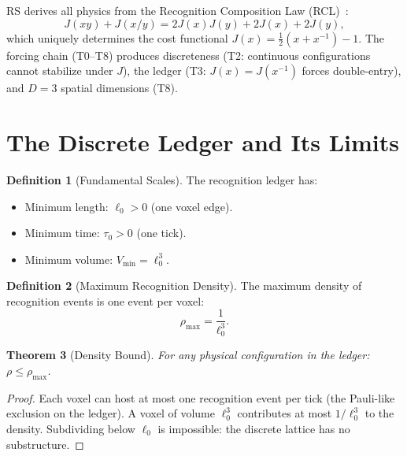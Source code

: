 \documentclass[12pt,a4paper]{article}
\newtheorem{theorem}{Theorem}[section]
\theoremstyle{definition}
\newtheorem{definition}[theorem]{Definition}
\theoremstyle{remark}
\begin{document}
RS derives all physics from the Recognition Composition Law
(RCL)~\cite{RS_Axioms}:
\begin{equation}
  J(xy) + J(x/y) = 2J(x)J(y) + 2J(x) + 2J(y),
\end{equation}
which uniquely determines the cost functional
$J(x) = \tfrac{1}{2}(x + x^{-1}) - 1$.  The forcing chain
(T0--T8) produces discreteness (T2: continuous
configurations cannot stabilize under $J$), the ledger
(T3: $J(x) = J(x^{-1})$ forces double-entry), and
$D = 3$ spatial dimensions (T8).

\section{The Discrete Ledger and Its Limits}
\label{sec:ledger}

\begin{definition}[Fundamental Scales]
The recognition ledger has:
\begin{itemize}
  \item Minimum length: $\ell_0 > 0$ (one voxel edge).
  \item Minimum time: $\tau_0 > 0$ (one tick).
  \item Minimum volume: $V_{\min} = \ell_0^3$.
\end{itemize}
\end{definition}

\begin{definition}[Maximum Recognition Density]
\label{def:rho-max}
The maximum density of recognition events is one event per voxel:
\begin{equation}
  \rho_{\max} = \frac{1}{\ell_0^3}.
\end{equation}
\end{definition}

\begin{theorem}[Density Bound]
\label{thm:density-bound}
For any physical configuration in the ledger:
$\rho \leq \rho_{\max}$.
\end{theorem}

\begin{proof}
Each voxel can host at most one recognition event per tick (the
Pauli-like exclusion on the ledger).  A voxel of volume $\ell_0^3$
contributes at most $1/\ell_0^3$ to the density.  Subdividing below
$\ell_0$ is impossible: the discrete lattice has no substructure.
\end{proof}
\end{document}
